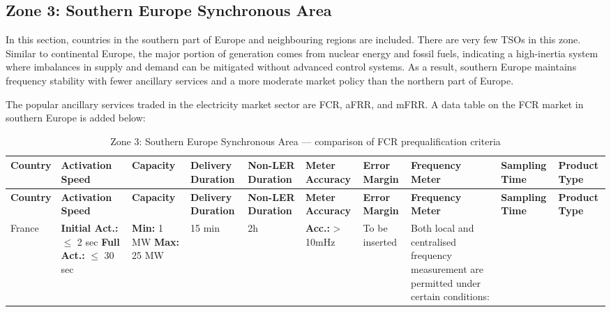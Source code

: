 \clearpage
\begin{landscape}


    \subsection{Zone 3: Southern Europe Synchronous Area}

In this section, countries in the southern part of Europe and neighbouring regions are included. There are very few TSOs in this zone. Similar to continental Europe, the major portion of generation comes from nuclear energy and fossil fuels, indicating a high-inertia system where imbalances in supply and demand can be mitigated without advanced control systems. As a result, southern Europe maintains frequency stability with fewer ancillary services and a more moderate market policy than the northern part of Europe.

The popular ancillary services traded in the electricity market sector are FCR, aFRR, and mFRR. A data table on the FCR market in southern Europe is added below:

\tiny
\setlength{\tabcolsep}{2pt}
\renewcommand{\arraystretch}{1.3}
\setlength{\LTleft}{0pt}
\setlength{\LTright}{0pt}
\begin{longtable}{|p{1.8cm}|p{2.2cm}|p{2.2cm}|p{2.2cm}|p{2.5cm}|p{1.5cm}|p{2.2cm}|p{4cm}|p{2.5cm}|p{2cm}|}
\caption{Zone 3: Southern Europe Synchronous Area --- comparison of FCR prequalification criteria}\label{tab:south_europe_fcr}\\
\hline
\textbf{Country} & \textbf{Activation Speed} & \textbf{Capacity} & \textbf{Delivery Duration} & \textbf{Non-LER Duration} & \textbf{Meter Accuracy} & \textbf{Error Margin} & \textbf{Frequency Meter} & \textbf{Sampling Time} & \textbf{Product Type} \\
\hline
\endfirsthead

\hline
\textbf{Country} & \textbf{Activation Speed} & \textbf{Capacity} & \textbf{Delivery Duration} & \textbf{Non-LER Duration} & \textbf{Meter Accuracy} & \textbf{Error Margin} & \textbf{Frequency Meter} & \textbf{Sampling Time} & \textbf{Product Type} \\
\hline
\endhead

France & 
\textbf{Initial Act.:} $\leq$ 2 sec \newline
\textbf{Full Act.:} $\leq$ 30 sec \newline
& 
\textbf{Min: }1 MW 
\newline \textbf{Max: }25 MW
& 15 min & 2h & 
\textbf{Acc.: }> 10mHz
& 
To be inserted
&
Both local and centralised frequency measurement are permitted under certain conditions:


\end{longtable}
\end{landscape}
